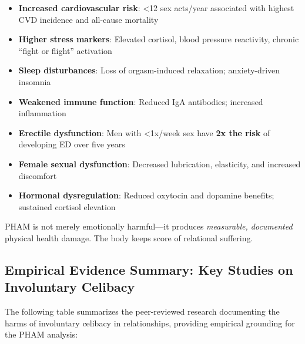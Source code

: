 \documentclass[12pt, letterpaper]{article}
\begin{document}
\begin{itemize}
    \item \textbf{Increased cardiovascular risk}: \textless12 sex acts/year associated with highest CVD incidence and all-cause mortality
    \item \textbf{Higher stress markers}: Elevated cortisol, blood pressure reactivity, chronic ``fight or flight'' activation
    \item \textbf{Sleep disturbances}: Loss of orgasm-induced relaxation; anxiety-driven insomnia
    \item \textbf{Weakened immune function}: Reduced IgA antibodies; increased inflammation
    \item \textbf{Erectile dysfunction}: Men with \textless1x/week sex have \textbf{2x the risk} of developing ED over five years
    \item \textbf{Female sexual dysfunction}: Decreased lubrication, elasticity, and increased discomfort
    \item \textbf{Hormonal dysregulation}: Reduced oxytocin and dopamine benefits; sustained cortisol elevation
\end{itemize}

PHAM is not merely emotionally harmful---it produces \textit{measurable, documented} physical health damage. The body keeps score of relational suffering.

\subsection{Empirical Evidence Summary: Key Studies on Involuntary Celibacy}

The following table summarizes the peer-reviewed research documenting the harms of involuntary celibacy in relationships, providing empirical grounding for the PHAM analysis:
\end{document}
